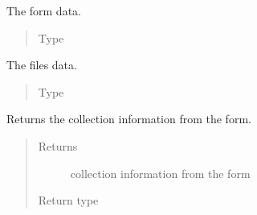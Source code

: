 \documentclass[letterpaper,10pt,english]{sphinxmanual}
\begin{document}
\begin{fulllineitems}
\begin{fulllineitems}
\label{\detokenize{autoapi/pine/client/index:pine.client.CollectionBuilder.form}}
The form data.
\begin{quote}\begin{description}
\item[{Type}] \leavevmode
{}

\end{description}\end{quote}

\end{fulllineitems}


\begin{fulllineitems}
\label{\detokenize{autoapi/pine/client/index:pine.client.CollectionBuilder.files}}
The files data.
\begin{quote}\begin{description}
\item[{Type}] \leavevmode
{}

\end{description}\end{quote}

\end{fulllineitems}


\begin{fulllineitems}
\label{\detokenize{autoapi/pine/client/index:pine.client.CollectionBuilder.collection}}
Returns the collection information from the form.
\begin{quote}\begin{description}
\item[{Returns}] \leavevmode
collection information from the form

\item[{Return type}] \leavevmode
{}


\end{description}
\end{quote}
\end{fulllineitems}
\end{fulllineitems}
\end{document}

